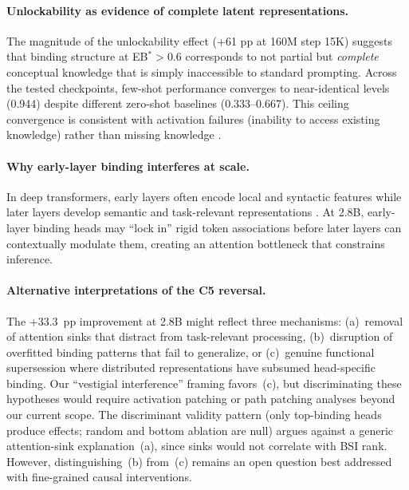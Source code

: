 \documentclass[10pt]{article} %
\begin{document}
\paragraph{Unlockability as evidence of complete latent representations.}
The magnitude of the unlockability effect (+61 pp at 160M step 15K) suggests that binding structure at EB$^*>0.6$ corresponds to not partial but \emph{complete} conceptual knowledge that is simply inaccessible to standard prompting.
Across the tested checkpoints, few-shot performance converges to near-identical levels (0.944) despite different zero-shot baselines (0.333--0.667).
This ceiling convergence is consistent with activation failures (inability to access existing knowledge) rather than missing knowledge \citep{burns2022discovering}.

\paragraph{Why early-layer binding interferes at scale.}
In deep transformers, early layers often encode local and syntactic features while later layers develop semantic and task-relevant representations \citep{tenney2019bert,hewitt2019structural}.
At 2.8B, early-layer binding heads may ``lock in'' rigid token associations before later layers can contextually modulate them, creating an attention bottleneck that constrains inference.

\paragraph{Alternative interpretations of the C5 reversal.}
The $+33.3$~pp improvement at 2.8B might reflect three mechanisms: (a)~removal of attention sinks that distract from task-relevant processing, (b)~disruption of overfitted binding patterns that fail to generalize, or (c)~genuine functional supersession where distributed representations have subsumed head-specific binding.
Our ``vestigial interference'' framing favors~(c), but discriminating these hypotheses would require activation patching or path patching analyses beyond our current scope.
The discriminant validity pattern (only top-binding heads produce effects; random and bottom ablation are null) argues against a generic attention-sink explanation~(a), since sinks would not correlate with BSI rank.
However, distinguishing~(b) from~(c) remains an open question best addressed with fine-grained causal interventions.
\end{document}
